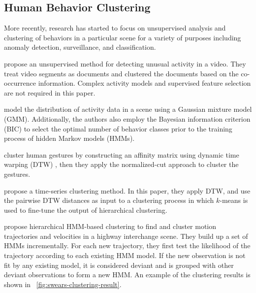 \subsection{Human Behavior Clustering}

More recently, research has started to focus on unsupervised analysis
and clustering of behaviors in a particular scene for a variety of
purposes including anomaly detection, surveillance, and
classification.

 propose an unsupervised method for
detecting unusual activity in a video. They treat video segments as
documents and clustered the documents based on the co-occurrence
information. Complex activity models and supervised feature selection
are not required in this paper.

 model the distribution of activity
data in a scene using a Gaussian mixture model (GMM). Additionally,
the authors also employ the Bayesian information criterion
(BIC)  to select the optimal number of
behavior classes prior to the training process of hidden Markov models
(HMMs).

 cluster human gestures by constructing an
affinity matrix using dynamic time warping
(DTW) , then they apply the
normalized-cut approach to cluster the gestures.

 propose a time-series clustering method. 
In this paper, they apply DTW, and use the pairwise DTW distances as
input to a clustering process in which $k$-means is used to fine-tune
the output of hierarchical clustering.

 propose hierarchical HMM-based
clustering to find and cluster motion trajectories and velocities in a
highway interchange scene. They build up a set of HMMs
incrementally. For each new trajectory, they first test the likelihood
of the trajectory according to each existing HMM model. If the new
observation is not fit by any existing model, it is considered deviant
and is grouped with other deviant observations to form a new HMM. An
example of the clustering results is shown
in \figurename~\ref{fig:swears-clustering-result}.

